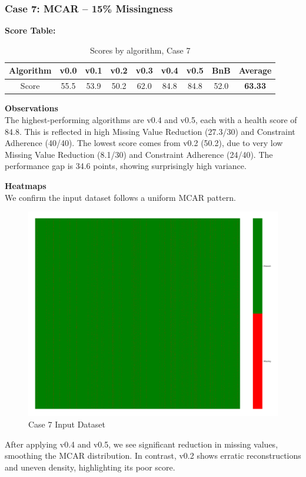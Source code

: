 \documentclass[a4paper,12pt]{article}
\begin{document}
\subsubsection{Case 7: MCAR – 15\% Missingness}

\textbf{Score Table:}

\begin{table}[H]
\centering
\caption{Scores by algorithm, Case 7}
\label{tab:score_algorithms_case7}
\begin{tabular}{|c|c|c|c|c|c|c|c|c|}
\hline
Algorithm & v0.0 & v0.1 & v0.2 & v0.3 & v0.4 & v0.5 & BnB & Average \\
\hline
Score & 55.5 & 53.9 & 50.2 & 62.0 & 84.8 & 84.8 & 52.0 & \textbf{63.33}  \\
\hline
\end{tabular}
\end{table}

\textbf{Observations}\\
The highest-performing algorithms are v0.4 and v0.5, each with a health score of 84.8. This is reflected in high Missing Value Reduction (27.3/30) and Constraint Adherence (40/40). The lowest score comes from v0.2 (50.2), due to very low Missing Value Reduction (8.1/30) and Constraint Adherence (24/40). The performance gap is 34.6 points, showing surprisingly high variance.

\textbf{Heatmaps}\\
We confirm the input dataset follows a uniform MCAR pattern.

\begin{figure}[H]
    \centering
    \includegraphics[width=0.5\linewidth]{case8_heatmap_erased.png}
    \caption{Case 7 Input Dataset}
\end{figure}

After applying v0.4 and v0.5, we see significant reduction in missing values, smoothing the MCAR distribution. In contrast, v0.2 shows erratic reconstructions and uneven density, highlighting its poor score.
\end{document}
